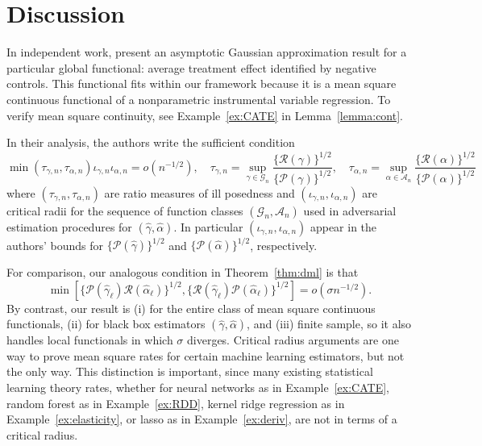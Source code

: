 \section{Discussion}

 In independent work, \cite[Theorem 9]{kallus2021causal} present an asymptotic Gaussian approximation result for a particular global functional: average treatment effect identified by negative controls. This functional fits within our framework because it is a mean square continuous functional of a nonparametric instrumental variable regression. To verify mean square continuity, see Example~\ref{ex:CATE} in Lemma~\ref{lemma:cont}.
 
 In their analysis, the authors write the sufficient condition
    $$\min(\tau_{\gamma,n},\tau_{\alpha,n}) \iota_{\gamma,n} \iota_{\alpha,n}=o(n^{-1/2}),\quad  \tau_{\gamma,n}=\sup_{\gamma \in \mathcal{G}_n}\frac{\{\mathcal{R}(\gamma)\}^{1/2}}{\{\mathcal{P}(\gamma)\}^{1/2}},\quad \tau_{\alpha,n}=\sup_{\alpha \in \mathcal{A}_n}\frac{\{\mathcal{R}(\alpha)\}^{1/2}}{\{\mathcal{P}(\alpha)\}^{1/2}}$$
    where
    $
   (\tau_{\gamma,n},\tau_{\alpha,n})
    $
    are ratio measures of ill posedness and $(\iota_{\gamma,n},\iota_{\alpha,n})$ are critical radii for the sequence of function classes $(\mathcal{G}_n,\mathcal{A}_n)$ used in adversarial estimation procedures for $(\hat{\gamma},\hat{\alpha})$. In particular $(\iota_{\gamma,n},\iota_{\alpha,n})$ appear in the authors' bounds for $\{\mathcal{P}(\hat{\gamma})\}^{1/2}$ and $\{\mathcal{P}(\hat{\alpha})\}^{1/2}$, respectively.
    
    For comparison, our analogous condition in Theorem~\ref{thm:dml} is that
    $$
   \min\left[\{\mathcal{P}(\hat{\gamma}_{\ell})\mathcal{R}(\hat{\alpha}_{\ell})\}^{1/2}, \{\mathcal{R}(\hat{\gamma}_{\ell})\mathcal{P}(\hat{\alpha}_{\ell})\}^{1/2}\right]=o(\sigma n^{-1/2}).
    $$
    By contrast, our result is (i) for the entire class of mean square continuous functionals, (ii) for black box estimators $(\hat{\gamma},\hat{\alpha})$, and (iii) finite sample, so it also handles local functionals in which $\sigma$ diverges. Critical radius arguments are one way to prove mean square rates for certain machine learning estimators, but not the only way. This distinction is important, since many existing statistical learning theory rates, whether for neural networks as in Example~\ref{ex:CATE}, random forest as in Example~\ref{ex:RDD}, kernel ridge regression as in  Example~\ref{ex:elasticity}, or lasso as in Example~\ref{ex:deriv}, are not in terms of a critical radius.